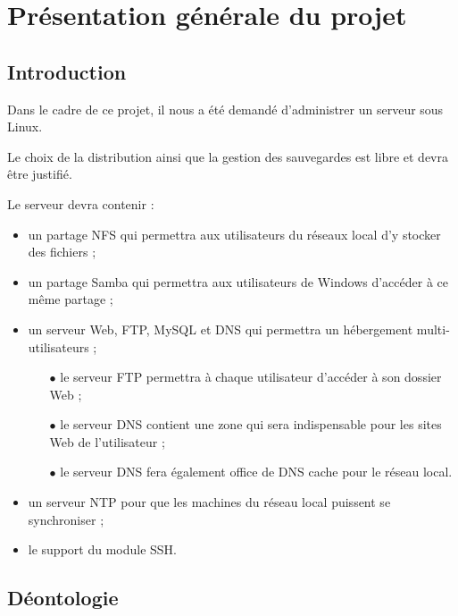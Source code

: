 \section{Présentation générale du projet}
\label{sec:pres-gener-du}

\subsection{Introduction}
\label{subsec:introduction}

Dans le cadre de ce projet, il nous a été demandé d'administrer un serveur sous
Linux.

Le choix de la distribution ainsi que la gestion des sauvegardes est libre et
devra être justifié.

Le serveur devra contenir :
\begin{itemize}
\item un partage NFS qui permettra aux utilisateurs du réseaux local d'y stocker
des fichiers ;

\item un partage Samba qui permettra aux utilisateurs de Windows d'accéder à ce
même partage ;

\item un serveur Web, FTP, MySQL et DNS qui permettra un hébergement
multi-utilisateurs ;
  \begin{itemize}
  \item[\tiny$\bullet$] le serveur FTP permettra à chaque utilisateur d'accéder
à son dossier Web ;
  \item[\tiny$\bullet$] le serveur DNS contient une zone qui sera indispensable
pour les sites Web de l'utilisateur ;
  \item[\tiny$\bullet$] le serveur DNS fera également office de DNS cache pour
le réseau local.
  \end{itemize}

\item un serveur NTP pour que les machines du réseau local puissent se
synchroniser ;

\item le support du module SSH.
\end{itemize}

\newpage

\subsection{Déontologie}
\label{subsec:déontologie}

